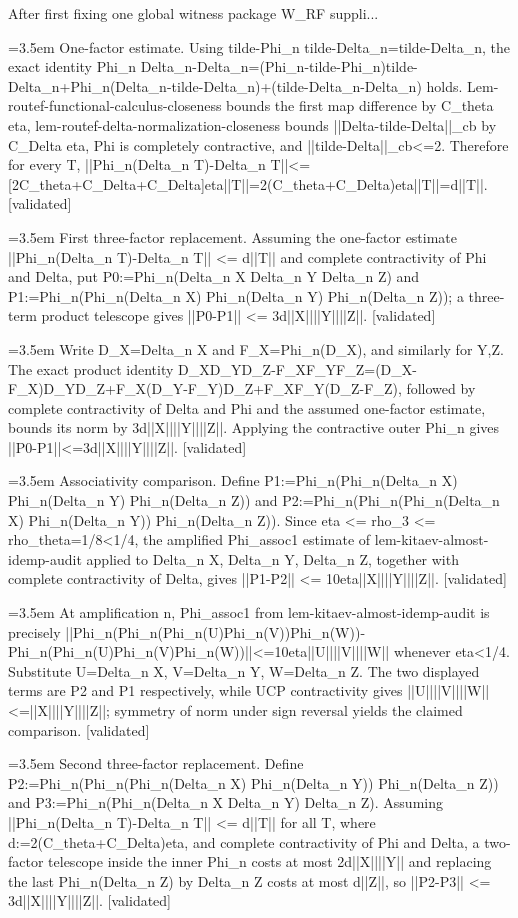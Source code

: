 \documentclass{article}
\newcommand{\step}[1]{\par\noindent\hangindent=3.5em\hangafter=1%
  \makebox[3.5em][l]{\textbf{#1.}}}
\newcommand{\steptag}[1]{\hfill{\small\textsf{[#1]}}}
\begin{document}
\begin{proofbox}{After first fixing one global witness package W\_RF suppli...}
\step{1.1.3} One-factor estimate. Using tilde-Phi\_n tilde-Delta\_n=tilde-Delta\_n, the exact identity Phi\_n Delta\_n-Delta\_n=(Phi\_n-tilde-Phi\_n)tilde-Delta\_n+Phi\_n(Delta\_n-tilde-Delta\_n)+(tilde-Delta\_n-Delta\_n) holds. Lem-routef-functional-calculus-closeness bounds the first map difference by C\_theta eta, lem-routef-delta-normalization-closeness bounds ||Delta-tilde-Delta||\_cb by C\_Delta eta, Phi is completely contractive, and ||tilde-Delta||\_cb<=2. Therefore for every T, ||Phi\_n(Delta\_n T)-Delta\_n T||<=[2C\_theta+C\_Delta+C\_Delta]eta||T||=2(C\_theta+C\_Delta)eta||T||=d||T||. \steptag{validated} \\[4pt]
\step{1.2} First three-factor replacement. Assuming the one-factor estimate ||Phi\_n(Delta\_n T)-Delta\_n T|| <= d||T|| and complete contractivity of Phi and Delta, put P0:=Phi\_n(Delta\_n X Delta\_n Y Delta\_n Z) and P1:=Phi\_n(Phi\_n(Delta\_n X) Phi\_n(Delta\_n Y) Phi\_n(Delta\_n Z)); a three-term product telescope gives ||P0-P1|| <= 3d||X||||Y||||Z||. \steptag{validated} \\[6pt]
\step{1.2.1} Write D\_X=Delta\_n X and F\_X=Phi\_n(D\_X), and similarly for Y,Z. The exact product identity D\_XD\_YD\_Z-F\_XF\_YF\_Z=(D\_X-F\_X)D\_YD\_Z+F\_X(D\_Y-F\_Y)D\_Z+F\_XF\_Y(D\_Z-F\_Z), followed by complete contractivity of Delta and Phi and the assumed one-factor estimate, bounds its norm by 3d||X||||Y||||Z||. Applying the contractive outer Phi\_n gives ||P0-P1||<=3d||X||||Y||||Z||. \steptag{validated} \\[4pt]
\step{1.3} Associativity comparison. Define P1:=Phi\_n(Phi\_n(Delta\_n X) Phi\_n(Delta\_n Y) Phi\_n(Delta\_n Z)) and P2:=Phi\_n(Phi\_n(Phi\_n(Delta\_n X) Phi\_n(Delta\_n Y)) Phi\_n(Delta\_n Z)). Since eta <= rho\_3 <= rho\_theta=1/8<1/4, the amplified Phi\_assoc1 estimate of lem-kitaev-almost-idemp-audit applied to Delta\_n X, Delta\_n Y, Delta\_n Z, together with complete contractivity of Delta, gives ||P1-P2|| <= 10eta||X||||Y||||Z||. \steptag{validated} \\[6pt]
\step{1.3.1} At amplification n, Phi\_assoc1 from lem-kitaev-almost-idemp-audit is precisely ||Phi\_n(Phi\_n(Phi\_n(U)Phi\_n(V))Phi\_n(W))-Phi\_n(Phi\_n(U)Phi\_n(V)Phi\_n(W))||<=10eta||U||||V||||W|| whenever eta<1/4. Substitute U=Delta\_n X, V=Delta\_n Y, W=Delta\_n Z. The two displayed terms are P2 and P1 respectively, while UCP contractivity gives ||U||||V||||W||<=||X||||Y||||Z||; symmetry of norm under sign reversal yields the claimed comparison. \steptag{validated} \\[4pt]
\step{1.4} Second three-factor replacement. Define P2:=Phi\_n(Phi\_n(Phi\_n(Delta\_n X) Phi\_n(Delta\_n Y)) Phi\_n(Delta\_n Z)) and P3:=Phi\_n(Phi\_n(Delta\_n X Delta\_n Y) Delta\_n Z). Assuming ||Phi\_n(Delta\_n T)-Delta\_n T|| <= d||T|| for all T, where d:=2(C\_theta+C\_Delta)eta, and complete contractivity of Phi and Delta, a two-factor telescope inside the inner Phi\_n costs at most 2d||X||||Y|| and replacing the last Phi\_n(Delta\_n Z) by Delta\_n Z costs at most d||Z||, so ||P2-P3|| <= 3d||X||||Y||||Z||. \steptag{validated} \\[6pt]

\end{proofbox}
\end{document}
